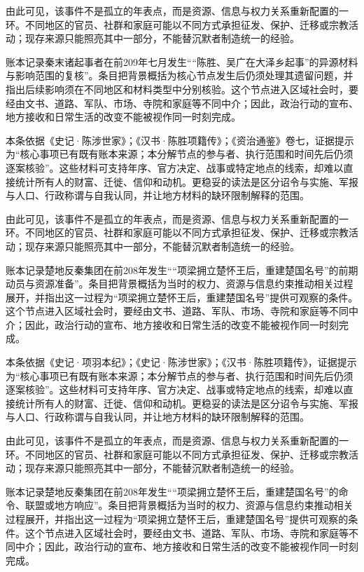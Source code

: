 由此可见，该事件不是孤立的年表点，而是资源、信息与权力关系重新配置的一环。不同地区的官员、社群和家庭可能以不同方式承担征发、保护、迁移或宗教活动；现存来源只能照亮其中一部分，不能替沉默者制造统一的经验。

账本记录秦末诸起事者在前209年七月发生““陈胜、吴广在大泽乡起事”的异源材料与影响范围的复核”。条目把背景概括为核心节点发生后仍须处理其遗留问题，并指出后续影响须在不同地区和材料类型中分别核验。这个节点进入区域社会时，要经由文书、道路、军队、市场、寺院和家庭等不同中介；因此，政治行动的宣布、地方接收和日常生活的改变不能被视作同一时刻完成。

本条依据《史记·陈涉世家》；《汉书·陈胜项籍传》；《资治通鉴》卷七，证据提示为“核心事项已有既有账本来源；本分解节点的参与者、执行范围和时间先后仍须逐案核验”。这些材料可支持年序、官方决定、战事或特定地点的线索，却难以直接统计所有人的财富、迁徙、信仰和动机。更稳妥的读法是区分诏令与实施、军报与人口、行政称谓与自我认同，并让地方材料的缺环限制解释的范围。

由此可见，该事件不是孤立的年表点，而是资源、信息与权力关系重新配置的一环。不同地区的官员、社群和家庭可能以不同方式承担征发、保护、迁移或宗教活动；现存来源只能照亮其中一部分，不能替沉默者制造统一的经验。

账本记录楚地反秦集团在前208年发生““项梁拥立楚怀王后，重建楚国名号”的前期动员与资源准备”。条目把背景概括为当时的权力、资源与信息约束推动相关过程展开，并指出这一过程为“项梁拥立楚怀王后，重建楚国名号”提供可观察的条件。这个节点进入区域社会时，要经由文书、道路、军队、市场、寺院和家庭等不同中介；因此，政治行动的宣布、地方接收和日常生活的改变不能被视作同一时刻完成。

本条依据《史记·项羽本纪》；《史记·陈涉世家》；《汉书·陈胜项籍传》，证据提示为“核心事项已有既有账本来源；本分解节点的参与者、执行范围和时间先后仍须逐案核验”。这些材料可支持年序、官方决定、战事或特定地点的线索，却难以直接统计所有人的财富、迁徙、信仰和动机。更稳妥的读法是区分诏令与实施、军报与人口、行政称谓与自我认同，并让地方材料的缺环限制解释的范围。

由此可见，该事件不是孤立的年表点，而是资源、信息与权力关系重新配置的一环。不同地区的官员、社群和家庭可能以不同方式承担征发、保护、迁移或宗教活动；现存来源只能照亮其中一部分，不能替沉默者制造统一的经验。

账本记录楚地反秦集团在前208年发生““项梁拥立楚怀王后，重建楚国名号”的命令、联盟或地方响应”。条目把背景概括为当时的权力、资源与信息约束推动相关过程展开，并指出这一过程为“项梁拥立楚怀王后，重建楚国名号”提供可观察的条件。这个节点进入区域社会时，要经由文书、道路、军队、市场、寺院和家庭等不同中介；因此，政治行动的宣布、地方接收和日常生活的改变不能被视作同一时刻完成。

